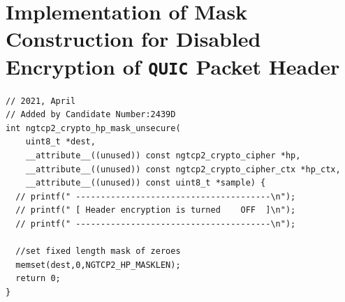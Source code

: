 \documentclass[12pt,a4paper]{report}
\begin{document}
\section{Implementation of Mask Construction for Disabled Encryption of \texttt{QUIC} Packet Header} 
\label{Implementation_of_mask_generation}

\begin{verbatim}
// 2021, April
// Added by Candidate Number:2439D
int ngtcp2_crypto_hp_mask_unsecure(
    uint8_t *dest, 
    __attribute__((unused)) const ngtcp2_crypto_cipher *hp,
    __attribute__((unused)) const ngtcp2_crypto_cipher_ctx *hp_ctx,
    __attribute__((unused)) const uint8_t *sample) {
  // printf(" ---------------------------------------\n");
  // printf(" [ Header encryption is turned    OFF  ]\n");
  // printf(" ---------------------------------------\n");

  //set fixed length mask of zeroes
  memset(dest,0,NGTCP2_HP_MASKLEN);
  return 0;
}
\end{verbatim}
\end{document}
